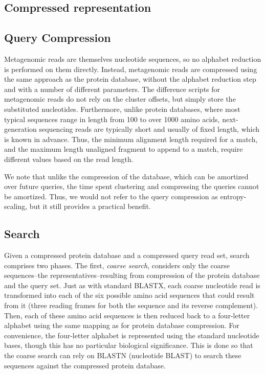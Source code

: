 \documentclass{amsbook}
\theoremstyle{definition}
\theoremstyle{remark}
\numberwithin{equation}{section}
\begin{document}
\subsection*{Compressed representation}



\subsection*{Query Compression}

Metagenomic reads are themselves nucleotide sequences, so no alphabet reduction
is performed on them directly.
Instead, metagenomic reads are compressed using the same approach as the
protein database, without the alphabet reduction step and with a number of
different parameters.
The difference scripts for metagenomic reads do not rely on the cluster offsets,
but simply store the substituted nucleotides.
Furthermore, unlike protein databases, where most typical sequences range in 
length from 100 to over 1000 amino acids, next-generation sequencing reads are 
typically short and usually of fixed length, which is known in advance.
Thus, the minimum alignment length required for a match, and the maximum
length unaligned fragment to append to a match, require different values based
on the read length.

We note that unlike the compression of the database, which can be amortized 
over future queries, the time spent clustering and compressing the queries 
cannot be amortized.
Thus, we would not refer to the query compression as entropy-scaling, but it
still provides a practical benefit.

\subsection*{Search}

Given a compressed protein database and a compressed query read set, search
comprises two phases.
The first, \emph{coarse search}, considers only the coarse sequences--the
representatives--resulting from compression of the protein database and the
query set.
Just as with standard BLASTX, each coarse nucleotide read is transformed into 
each of the six possible amino acid sequences that could result from it (three 
reading frames for both the sequence and its reverse complement).
Then, each of these amino acid sequences is then reduced back to a four-letter
alphabet using the same mapping as for protein database compression.
For convenience, the four-letter alphabet is represented using the standard
nucleotide bases, though this has no particular biological significance.
This is done so that the coarse search can rely on BLASTN (nucleotide BLAST) to
search these sequences against the compressed protein database.
\end{document}
